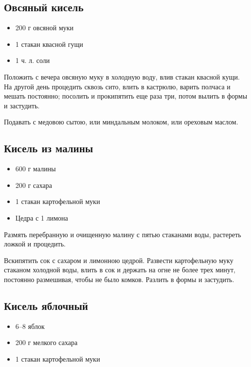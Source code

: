 \subsection{Овсяный кисель}

\begin{itemize}
	\item 200 г овсяной муки 
    \item 1 стакан квасной гущи 
    \item 1 ч. л. соли
\end{itemize}

Положить с вечера овсяную муку в холодную воду, влив стакан квасной кущи. На другой день процедить сквозь сито, влить в кастрюлю, варить полчаса и мешать постоянно; посолить и прокипятить еще раза три, потом вылить в формы и застудить.

Подавать с медовою сытою, или миндальным молоком, или ореховым маслом.

\subsection{Кисель из малины}

\begin{itemize}
	\item 600 г малины 
    \item 200 г сахара 
    \item 1 стакан картофельной муки 
    \item Цедра с 1 лимона
\end{itemize}

Размять перебранную и очищенную малину с пятью стаканами воды, растереть ложкой и процедить.

Вскипятить сок с сахаром и лимонною цедрой. Развести картофельную муку стаканом холодной воды, влить в сок и держать на огне не более трех минут, постоянно размешивая, чтобы не было комков. Разлить в формы и застудить.

\subsection{Кисель яблочный}

\begin{itemize}
	\item 6–8 яблок 
    \item 200 г мелкого сахара 
    \item 1 стакан картофельной муки
\end{itemize}

